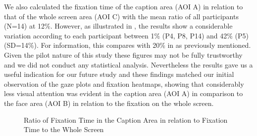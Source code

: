 \documentclass[output=paper]{langsci/langscibook}
\begin{document}
\largerpage[-1] 
We also calculated the fixation time of the caption area (AOI A) in relation to that of the whole screen area (AOI C) with the mean ratio of all participants (N=14) at 12\%.  However, as illustrated in , the results show a considerable variation according to each participant between 1\% (P4, P8, P14) and 42\% (P5) (SD=14\%).  For information, this compares with 20\% in \citet{dydewalle1991} as previously mentioned. Given the pilot nature of this study these figures may not be fully trustworthy and we did not conduct any statistical analysis. Nevertheless the results gave us a useful indication for our future study and these findings matched our initial observation of the gaze plots and fixation heatmaps, showing that considerably less visual attention was evident in the caption area (AOI A) in comparison to the face area (AOI B) in relation to the fixation on the whole screen.  

\begin{figure}



\caption{Ratio of Fixation Time in the Caption Area in relation to Fixation Time to the Whole Screen}
\label{ohagan:fig:5}
\end{figure}
\end{document}
